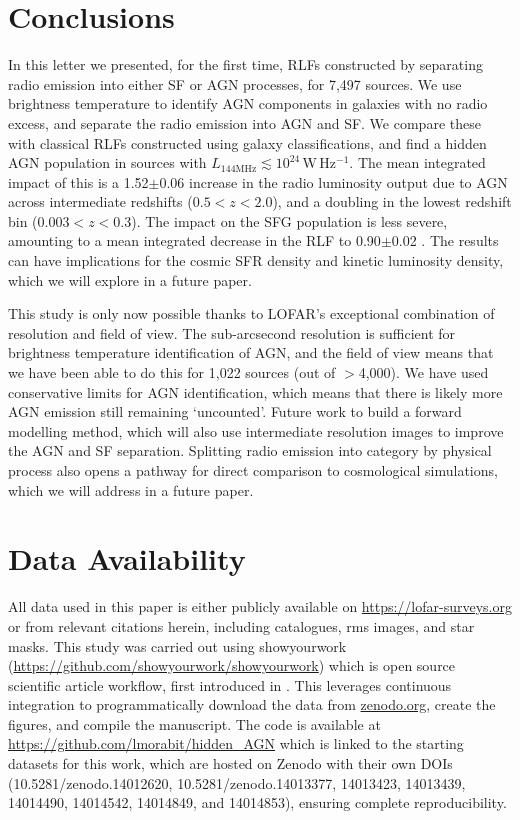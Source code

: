 \documentclass[usenatbib,fleqn,letters]{mnras}
\newcommand{\wphz}{$\,$W$\,$Hz$^{-1}$}
\newcommand{\llof}{$L_{\textrm{144MHz}}$}
\begin{document}
\section{Conclusions}
\label{sec:conclusions}
In this letter we presented, for the first time, RLFs constructed by separating radio emission into either SF or AGN processes, for 7,497 sources. We use brightness temperature to identify AGN components in galaxies with no radio excess, and separate the radio emission into AGN and SF. We compare these with classical RLFs constructed using galaxy classifications, and find a hidden AGN population in sources with \llof $\lesssim 10^{24}$\wphz . The mean integrated impact of this is a 1.52$\pm$0.06 increase in the radio luminosity output due to AGN across intermediate redshifts ($0.5 < z < 2.0$), and a doubling in the lowest redshift bin ($0.003 < z < 0.3$). The impact on the SFG population is less severe, amounting to a mean integrated decrease in the RLF to 0.90$\pm$0.02 . The results can have implications for the cosmic SFR density and kinetic luminosity density, which we will explore in a future paper. 

This study is only now possible thanks to LOFAR's exceptional combination of resolution and field of view. The sub-arcsecond resolution is sufficient for brightness temperature identification of AGN, and the field of view means that we have been able to do this for 1,022 sources (out of $>$4,000). We have used conservative limits for AGN identification, which means that there is likely more AGN emission still remaining `uncounted'. Future work to build a forward modelling method, which will also use intermediate resolution images to improve the AGN and SF separation. Splitting radio emission into category by physical process also opens a pathway for direct comparison to cosmological simulations, which we will address in a future paper. 


\section*{Data Availability}
All data used in this paper is either publicly available on \href{https://lofar-surveys.org}{https://lofar-surveys.org} or from relevant citations herein, including catalogues, rms images, and star masks.  This study was carried out using showyourwork (\href{https://github.com/showyourwork/showyourwork}{https://github.com/showyourwork/showyourwork}) which is open source scientific article workflow, first introduced in \cite{luger_mapping_2021}. This leverages continuous integration to
programmatically download the data from \href{https://zenodo.org/}{zenodo.org}, create the figures, and compile the manuscript. The code is available at \href{https://github.com/lmorabit/hidden_AGN}{https://github.com/lmorabit/hidden\_AGN} which is linked to the starting datasets for this work, which are hosted on Zenodo with their own DOIs (10.5281/zenodo.14012620, 10.5281/zenodo.14013377, 14013423, 14013439, 14014490, 14014542, 14014849, and 14014853), ensuring complete reproducibility. 
\end{document}

